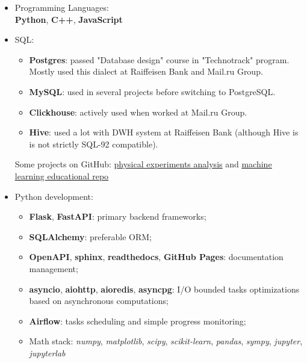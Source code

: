 \begin{itemize}
	\item Programming Languages: \\ 
        \textbf{Python}, \textbf{C++}, \textbf{JavaScript}
    \item SQL: 
        \begin{itemize}
            \item \textbf{Postgres}: passed "Database design" course in "Technotrack" program. Mostly used this dialect at Raiffeisen Bank and Mail.ru Group.
            \item \textbf{MySQL}: used in several projects before switching to PostgreSQL.
            \item \textbf{Clickhouse}: actively used when worked at Mail.ru Group.
            \item \textbf{Hive}: used a lot with DWH system at Raiffeisen Bank (although Hive is is not strictly SQL-92 compatible).
        \end{itemize}
    Some projects on GitHub: \href{https://github.com/alekseik1/phys\_labs}{\underline{physical experiments analysis}} and \href{https://github.com/alekseik1/machine\_learning\_coursera}{\underline{machine learning educational repo}}
    \item Python development: 
        \begin{itemize}
            \item \textbf{Flask}, \textbf{FastAPI}: primary backend frameworks;
            \item \textbf{SQLAlchemy}: preferable ORM;
            \item \textbf{OpenAPI}, \textbf{sphinx}, \textbf{readthedocs}, \textbf{GitHub Pages}: documentation management;
            \item \textbf{asyncio}, \textbf{aiohttp}, \textbf{aioredis}, \textbf{asyncpg}: I/O bounded tasks optimizations based on asynchronous computations;
            \item \textbf{Airflow}: tasks scheduling and simple progress monitoring;
            \item Math stack: \textit{numpy}, \textit{matplotlib}, \textit{scipy}, \textit{scikit-learn}, \textit{pandas}, \textit{sympy}, \textit{jupyter}, \textit{jupyterlab}

\end{itemize}
\end{itemize}
